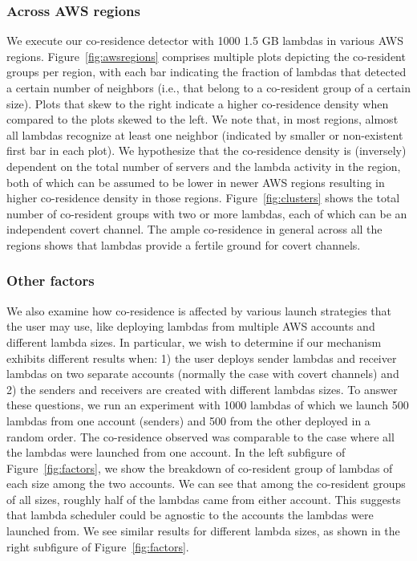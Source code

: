 \subsubsection{Across AWS regions}  
We execute our co-residence detector with 1000 1.5 GB lambdas in various AWS
regions. Figure~\ref{fig:awsregions} comprises multiple plots depicting
the co-resident groups per region, with each bar indicating the fraction of
lambdas that detected a certain number of neighbors (i.e., that belong to a
co-resident group of a certain size). Plots that skew to the right indicate a
higher co-residence density when compared to the plots skewed to the left. 
We note that, in most regions, almost
all lambdas recognize at least one neighbor (indicated by smaller or
non-existent first bar in each plot). We hypothesize that the co-residence
density is (inversely) dependent on the total number of servers and the lambda
activity in the region, both of which can be assumed to be lower in newer AWS
regions resulting in higher co-residence density in those regions. 
Figure~\ref{fig:clusters} shows the total number of co-resident groups with 
two or more lambdas, each of which can be an independent covert channel. 
The ample co-residence in general across all the
regions shows that lambdas provide a fertile ground for covert channels.


\subsubsection{Other factors}
We also examine how co-residence is affected by various launch strategies that
the user may use, like deploying lambdas from multiple AWS accounts and
different lambda sizes. In particular, we wish to determine if our mechanism
exhibits different results when: 1) the user deploys sender lambdas and receiver
lambdas on two separate accounts (normally the case with covert channels) and 2)
the senders and receivers are created with different lambdas sizes.  To answer
these questions, we run an experiment with 1000 lambdas of which we launch 500
lambdas from one account (senders) and 500 from the other deployed in a random
order. The co-residence observed was comparable to the case where all the
lambdas were launched from one account. In the left subfigure of
Figure~\ref{fig:factors}, we show the breakdown of co-resident group of lambdas
of each size among the two accounts.  We can see that among the co-resident
groups of all sizes, roughly half of the lambdas came from either account. This suggests 
that lambda scheduler could be agnostic to the accounts the lambdas were launched
from. We see similar results for different lambda sizes, as shown in the right
subfigure of Figure~\ref{fig:factors}.

